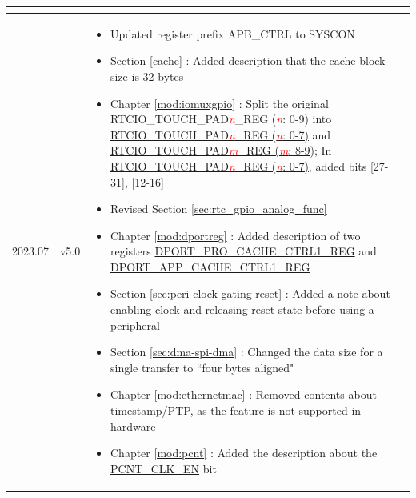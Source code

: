 \begin{longtable}[l]{ | m{2cm} | m{1.5cm} | m{12cm} | }
\begin{itemize}
    \end{itemize}
    \vspace{-1em}
    \\\hline
    2023.07 & v5.0 &
    \vspace{0.5em}
\begin{itemize}
    \item Updated register prefix APB\_CTRL to SYSCON %
    \item Section \ref{cache} \textit{\nameref{cache}}: Added description that the cache block size is 32 bytes %
    \item Chapter \ref{mod:iomuxgpio} \textit{\nameref{mod:iomuxgpio}}: Split the original RTCIO\_TOUCH\_PAD\textcolor{red}{\it{n}}\_REG (\textcolor{red}{\it{n}}: 0-9) into \hyperref[regdesc:RTCIOTOUCHPADnREG]{RTCIO\_TOUCH\_PAD\textcolor{red}{\it{n}}\_REG (\textcolor{red}{\it{n}}: 0-7)} and \hyperref[regdesc:RTCIOTOUCHPADmREG]{RTCIO\_TOUCH\_PAD\textcolor{red}{\it{m}}\_REG (\textcolor{red}{\it{m}}: 8-9)}; In \hyperref[regdesc:RTCIOTOUCHPADnREG]{RTCIO\_TOUCH\_PAD\textcolor{red}{\it{n}}\_REG (\textcolor{red}{\it{n}}: 0-7)}, added bits [27-31], [12-16] %
    \item Revised Section \ref{sec:rtc_gpio_analog_func} \textit{\nameref{sec:rtc_gpio_analog_func}} %
    \item Chapter \ref{mod:dportreg} \textit{\nameref{mod:dportreg}}: Added description of two registers \hyperref[regdesc:PROCACHECTRL1REG]{DPORT\_PRO\_CACHE\_CTRL1\_REG} and \hyperref[regdesc:APPCACHECTRL1REG]{DPORT\_APP\_CACHE\_CTRL1\_REG} %
    \item Section \ref{sec:peri-clock-gating-reset} \textit{\nameref{sec:peri-clock-gating-reset}}: Added a note about enabling clock and releasing reset state before using a peripheral %
    \item Section \ref{sec:dma-spi-dma} \textit{\nameref{sec:dma-spi-dma}}: Changed the data size for a single transfer to ``four bytes aligned" %
    \item Chapter \ref{mod:ethernetmac} \textit{\nameref{mod:ethernetmac}}: Removed contents about timestamp/PTP, as the feature is not supported in hardware %
    \item Chapter \ref{mod:pcnt} \textit{\nameref{mod:pcnt}}: Added the description about the \hyperref[regdesc:PCNTCTRLREG]{PCNT\_CLK\_EN} bit %
\end{itemize}
\vspace{-1em}
\\\hline

\end{longtable}
